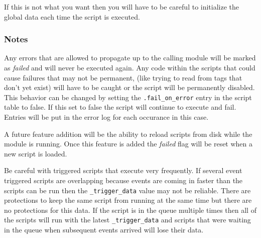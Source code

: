 If this is not what you want then you will have to be careful to initialize
the global data each time the script is executed.

\subsubsection*{Notes}

Any errors that are allowed to propagate up to the calling module
will be marked as \textit{failed} and will never be executed again. Any
code within the scripts that could cause failures that may not be permanent,
(like trying to read from tags that don't yet exist) will have to be caught
or the script will be permanently disabled.
This behavior can be changed by setting the \texttt{.fail\_on\_error}
entry in the script table to false.  If this set to false the script
will continue to execute and fail.  Entries will be put in the error
log for each occurance in this case.

A future feature addition will be the ability to reload scripts from disk
while the module is running.  Once this feature is added the \textit{failed}
flag will be reset when a new script is loaded.

Be careful with triggered scripts that execute very frequently.  If several
event triggered scripts are overlapping because events are coming in faster
than the scripts can be run then the \texttt{\_trigger\_data} value may
not be reliable.  There are protections to keep the same script from running
at the same time but there are no protections for this data.  If the
script is in the queue multiple times then all of the scripts will run
with the latest \texttt{\_trigger\_data} and scripts that were waiting in
the queue when subsequent events arrived will lose their data.